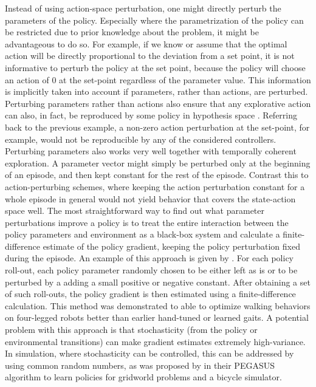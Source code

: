 \label{ssec:parameterspace}
Instead of using action-space perturbation, one might directly perturb the parameters of the policy. Especially where the parametrization of the policy can be restricted due to prior knowledge about the problem, it might be advantageous to do so. For example, if we know or assume that the optimal action will be directly proportional to the deviation from a set point, it is not informative to perturb the policy at the set point, because the policy will choose an action of 0 at the set-point regardless of the parameter value. This information is implicitly taken into account if parameters, rather than actions, are perturbed. 
Perturbing parameters rather than actions also ensure that any explorative action can also, in fact, be reproduced by some policy in hypothesis space . Referring back to the previous example, a non-zero action perturbation at the set-point, for example, would not be reproducible by any of the considered controllers.
Perturbing parameters also works very well together with temporally coherent exploration. A parameter vector might simply be perturbed only at the beginning of an episode, and then kept constant for the rest of the episode. Contrast this to action-perturbing schemes, where keeping the action perturbation constant for a whole episode in general would not yield behavior that covers the state-action space well.
The most straightforward way to find out what parameter perturbations improve a policy is to treat the entire interaction between the policy parameters and environment as a black-box system and calculate a finite-difference estimate of the policy gradient, keeping the policy perturbation fixed during the episode. An example of this approach is given by . For each policy roll-out, each policy parameter randomly chosen to be either left as is or to be perturbed by a adding a small positive or negative constant. After obtaining a set of such roll-outs, the policy gradient is then estimated using a finite-difference calculation. This method was demonstrated to able to optimize walking behaviors on four-legged robots better than earlier hand-tuned or learned gaits. 
A potential problem with this approach is that stochasticity (from the policy or environmental transitions) can make gradient estimates extremely high-variance. In simulation, where stochasticity can be controlled, this can be addressed by using common random numbers, as was proposed by  in their PEGASUS algorithm to learn policies for gridworld problems and a bicycle simulator.  
